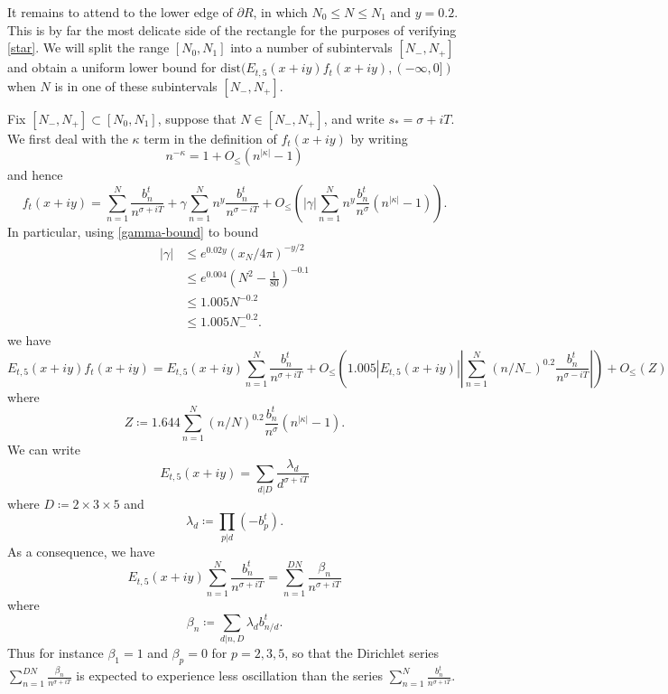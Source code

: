\documentclass[a4paper,11pt,twoside]{amsart}
\begin{document}
It remains to attend to the lower edge of $\partial R$, in which $N_0 \leq N \leq N_1$ and $y=0.2$.  This is by far the most delicate side of the rectangle for the purposes of verifying \eqref{star}.  We will split the range $[N_0,N_1]$ into a number of subintervals $[N_-,N_+]$ and obtain a uniform lower bound for $\mathrm{dist}( E_{t,5}(x+iy) f_t(x+iy), (-\infty,0])$ when $N$ is in one of these subintervals $[N_-,N_+]$.

Fix $[N_-,N_+] \subset [N_0,N_1]$, suppose that $N \in [N_-,N_+]$, and write $s_* = \sigma + iT$.  We first deal with the $\kappa$ term in the definition of $f_t(x+iy)$ by writing
$$ n^{-\kappa} = 1 + O_{\leq}( n^{|\kappa|}-1)$$
and hence
\begin{equation}\label{ftxy}
 f_t(x+iy) = \sum_{n=1}^N \frac{b_n^t}{n^{\sigma+iT}} + \gamma \sum_{n=1}^N n^y \frac{b_n^t}{n^{\sigma-iT}}
+ O_{\leq}\left( |\gamma| \sum_{n=1}^N n^y \frac{b_n^t}{n^\sigma} (n^{|\kappa|}-1) \right).
\end{equation}
In particular, using \eqref{gamma-bound} to bound
\begin{align*}
|\gamma| &\leq e^{0.02y} (x_N/4\pi)^{-y/2} \\
&\leq e^{0.004} \left(N^2 - \frac{1}{80}  \right)^{-0.1} \\
&\leq 1.005 N^{-0.2} \\
&\leq 1.005 N_-^{-0.2}.
\end{align*}
we have
$$ E_{t,5}(x+iy) f_t(x+iy) = E_{t,5}(x+iy) \sum_{n=1}^N \frac{b_n^t}{n^{\sigma+iT}} + O_{\leq}\left( 1.005 |E_{t,5}(x+iy)| 
\left|\sum_{n=1}^N (n/N_-)^{0.2} \frac{b_n^t}{n^{\sigma-iT}}\right| \right)
+ O_{\leq}( Z )$$
where
$$ Z \coloneqq 1.644 \sum_{n=1}^N (n/N)^{0.2} \frac{b_n^t}{n^\sigma} (n^{|\kappa|}-1).$$
We can write
$$ E_{t,5}(x+iy) = \sum_{d|D} \frac{\lambda_d}{d^{\sigma+iT}}$$
where $D \coloneqq 2 \times 3 \times 5$ and
$$ \lambda_d \coloneqq \prod_{p|d} (-b_p^t).$$
As a consequence, we have
$$ E_{t,5}(x+iy) \sum_{n=1}^N \frac{b_n^t}{n^{\sigma+iT}} = \sum_{n=1}^{DN} \frac{\beta_{n}}{n^{\sigma+iT}}$$
where
$$ \beta_{n} \coloneqq \sum_{d|n,D} \lambda_d b_{n/d}^t.$$
Thus for instance $\beta_1 = 1$ and $\beta_p = 0$ for $p=2,3,5$, so that the Dirichlet series $\sum_{n=1}^{DN} \frac{\beta_n}{n^{\sigma+iT}}$ is expected to experience less oscillation than the series $\sum_{n=1}^N \frac{b_n^t}{n^{\sigma+iT}}$.
\end{document}

